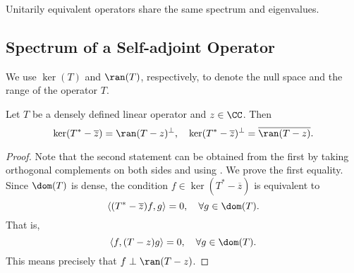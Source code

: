\documentclass[oneside,reqno,letterpaper]{amsart}
\begin{document}
\begin{proposition}
  \label{thm:spectrum-of-unitarily-equivalent-operators}
  Unitarily equivalent operators share the same spectrum and eigenvalues.
\end{proposition}



\subsection{Spectrum of a Self-adjoint Operator}
We use \(\ker(T)\) and \(\ran(T)\), respectively, to denote the null space and the range of the operator \(T\). 
\begin{proposition}
\label{thm:nullspace-and-range-of-adjoint}
  Let \(T\) be a densely defined linear operator and \(z \in \CC\). Then
  \[
    \ker(T^* - \overline{z}) = \ran(T - z)^\perp, \quad \ker(T^* - \overline{z})^\perp = \overline{\ran(T - z)} . 
  \] 
\end{proposition}
\begin{proof}
  Note that the second statement can be obtained from the first by taking orthogonal complements on both sides and using . 
  We prove the first equality. 
  Since \(\dom(T)\) is dense, the condition \(f \in \ker(T^* - \overline{z})\) is equivalent to 
  \[
    \left< (T^* -  \overline{z})f, g \right> = 0, \quad \forall g \in \dom(T) . 
  \]
  That is, 
  \[
    \left< f, (T - z) g \right> = 0, \quad \forall g \in \dom(T) . 
  \] 
  This means precisely that \(f \perp \ran(T - z)\). 
\end{proof}
\end{document}
